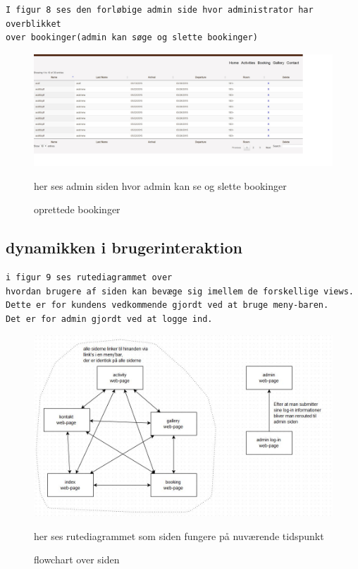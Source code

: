 \documentclass[12pt,a4paper]{article}
\begin{document}
\begin{verbatim}
I figur 8 ses den forløbige admin side hvor administrator har overblikket
over bookinger(admin kan søge og slette bookinger) 
\end{verbatim}
\begin{figure}[H]
\centering
\includegraphics[scale=0.4] {brugergransefladebilled3.jpg}
\caption{oprettede bookinger}
her ses admin siden hvor admin kan se og slette bookinger
\end{figure}

\subsection{dynamikken i brugerinteraktion}
\begin{verbatim}
i figur 9 ses rutediagrammet over 
hvordan brugere af siden kan bevæge sig imellem de forskellige views. 
Dette er for kundens vedkommende gjordt ved at bruge meny-baren.
Det er for admin gjordt ved at logge ind.
\end{verbatim}
\begin{figure}[H]
\centering
\includegraphics[scale=0.6] {flowchart.jpg}
\caption{flowchart over siden}
her ses rutediagrammet som siden fungere på nuværende tidspunkt
\end{figure}
\end{document}
